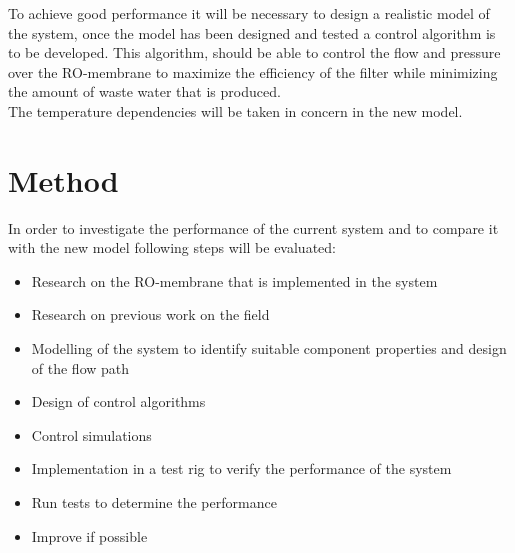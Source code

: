 To achieve good performance it will be necessary to design a realistic model of the system, once the model has been designed and tested a control algorithm is to be developed. This algorithm, should be able to control the flow and pressure over the RO-membrane to maximize the efficiency of the filter while minimizing the amount of waste water that is produced. \\

The temperature dependencies will be taken in concern in the new model.


\section*{Method}

In order to investigate the performance of the current system and to compare it with the new model following steps will be evaluated:

\begin{itemize}
\renewcommand\labelitemi{-}
    \item Research on the RO-membrane that is implemented in the system  
    \item Research on previous work on the field
    \item Modelling of the system to identify suitable component properties and design of the flow path
    \item Design of control algorithms
    \item Control simulations
    \item Implementation in a test rig to verify the performance of the system
    \item Run tests to determine the performance
    \item Improve if possible
\end{itemize}




